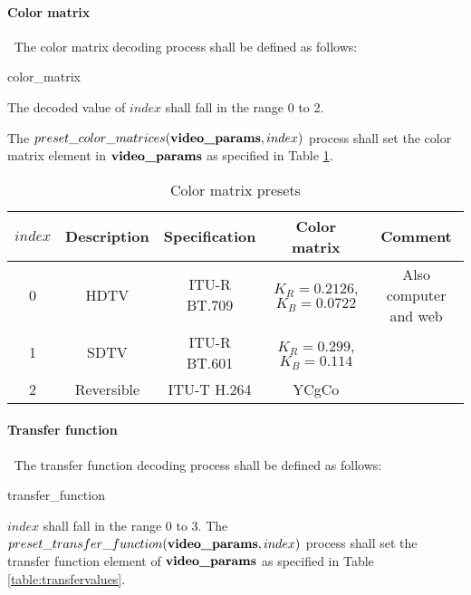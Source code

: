 \paragraph{Color matrix}
\label{colormatrix}
$\ $\newline
The color matrix decoding process shall be defined as follows:

\begin{pseudo}{color\_matrix}{}
\bsEND
\end{pseudo}

The decoded value of $index$ shall fall in the range 0 to 2. 

The $preset\_color\_matrices(\textbf{video\_params},index)$ process shall set the color 
matrix element in $\textbf{video\_params}$ as specified
in Table \ref{table:matrixvalues}.

\begin{table}[!ht]
\centering
\begin{tabular}{|c|c|c|c|c|}
\hline
\rowcolor[gray]{0.75}$index$ &  {\bf Description} & {\bf Specification} & {\bf Color matrix} & {\bf Comment}\\
\hline
0 & HDTV & ITU-R BT.709 & $K_R=0.2126$, $K_B=0.0722$ & Also computer and web\\ 
\hline
1 & SDTV & ITU-R BT.601 & $K_R=0.299$, $K_B=0.114$ & \\
\hline
2 & Reversible & ITU-T H.264 & YCgCo & \\
\hline
\end{tabular}
\caption{Color matrix presets}\label{table:matrixvalues}
\end{table}

\paragraph{Transfer function}
\label{transferfunction}
$\ $\newline
The transfer function decoding process shall be defined as follows:

\begin{pseudo}{transfer\_function}{\VideoParams}
\bsEND
\end{pseudo}

$index$ shall fall in the range 0 to 3. The $preset\_transfer\_function(\textbf{video\_params},index)$ process shall set the transfer function
element of $\textbf{video\_params}$ as specified
in Table \ref{table:transfervalues}.

